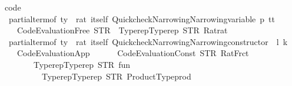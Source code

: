 \begin{isabellebody}
%
\endisadelimproof
\isanewline
\isanewline
{}\isamarkupfalse%
\ {\isacharbrackleft}{\kern0pt}code{\isacharbrackright}{\kern0pt}{\isacharcolon}{\kern0pt}\isanewline
\ \ {\isachardoublequoteopen}partial{\isacharunderscore}{\kern0pt}term{\isacharunderscore}{\kern0pt}of\ {\isacharparenleft}{\kern0pt}ty\ {\isacharcolon}{\kern0pt}{\isacharcolon}{\kern0pt}\ rat\ itself{\isacharparenright}{\kern0pt}\ {\isacharparenleft}{\kern0pt}Quickcheck{\isacharunderscore}{\kern0pt}Narrowing{\isachardot}{\kern0pt}Narrowing{\isacharunderscore}{\kern0pt}variable\ p\ tt{\isacharparenright}{\kern0pt}\ {\isasymequiv}\isanewline
\ \ \ \ Code{\isacharunderscore}{\kern0pt}Evaluation{\isachardot}{\kern0pt}Free\ {\isacharparenleft}{\kern0pt}STR\ {\isacharprime}{\kern0pt}{\isacharprime}{\kern0pt}{\isacharunderscore}{\kern0pt}{\isacharprime}{\kern0pt}{\isacharprime}{\kern0pt}{\isacharparenright}{\kern0pt}\ {\isacharparenleft}{\kern0pt}Typerep{\isachardot}{\kern0pt}Typerep\ {\isacharparenleft}{\kern0pt}STR\ {\isacharprime}{\kern0pt}{\isacharprime}{\kern0pt}Rat{\isachardot}{\kern0pt}rat{\isacharprime}{\kern0pt}{\isacharprime}{\kern0pt}{\isacharparenright}{\kern0pt}\ {\isacharbrackleft}{\kern0pt}{\isacharbrackright}{\kern0pt}{\isacharparenright}{\kern0pt}{\isachardoublequoteclose}\isanewline
\ \ {\isachardoublequoteopen}partial{\isacharunderscore}{\kern0pt}term{\isacharunderscore}{\kern0pt}of\ {\isacharparenleft}{\kern0pt}ty\ {\isacharcolon}{\kern0pt}{\isacharcolon}{\kern0pt}\ rat\ itself{\isacharparenright}{\kern0pt}\ {\isacharparenleft}{\kern0pt}Quickcheck{\isacharunderscore}{\kern0pt}Narrowing{\isachardot}{\kern0pt}Narrowing{\isacharunderscore}{\kern0pt}constructor\ {}\ {\isacharbrackleft}{\kern0pt}l{\isacharcomma}{\kern0pt}\ k{\isacharbrackright}{\kern0pt}{\isacharparenright}{\kern0pt}\ {\isasymequiv}\isanewline
\ \ \ \ Code{\isacharunderscore}{\kern0pt}Evaluation{\isachardot}{\kern0pt}App\isanewline
\ \ \ \ \ \ {\isacharparenleft}{\kern0pt}Code{\isacharunderscore}{\kern0pt}Evaluation{\isachardot}{\kern0pt}Const\ {\isacharparenleft}{\kern0pt}STR\ {\isacharprime}{\kern0pt}{\isacharprime}{\kern0pt}Rat{\isachardot}{\kern0pt}Frct{\isacharprime}{\kern0pt}{\isacharprime}{\kern0pt}{\isacharparenright}{\kern0pt}\isanewline
\ \ \ \ \ \ \ \ {\isacharparenleft}{\kern0pt}Typerep{\isachardot}{\kern0pt}Typerep\ {\isacharparenleft}{\kern0pt}STR\ {\isacharprime}{\kern0pt}{\isacharprime}{\kern0pt}fun{\isacharprime}{\kern0pt}{\isacharprime}{\kern0pt}{\isacharparenright}{\kern0pt}\isanewline
\ \ \ \ \ \ \ \ \ \ {\isacharbrackleft}{\kern0pt}Typerep{\isachardot}{\kern0pt}Typerep\ {\isacharparenleft}{\kern0pt}STR\ {\isacharprime}{\kern0pt}{\isacharprime}{\kern0pt}Product{\isacharunderscore}{\kern0pt}Type{\isachardot}{\kern0pt}prod{\isacharprime}{\kern0pt}{\isacharprime}{\kern0pt}{\isacharparenright}{\kern0pt}\isanewline

\end{isabellebody}
